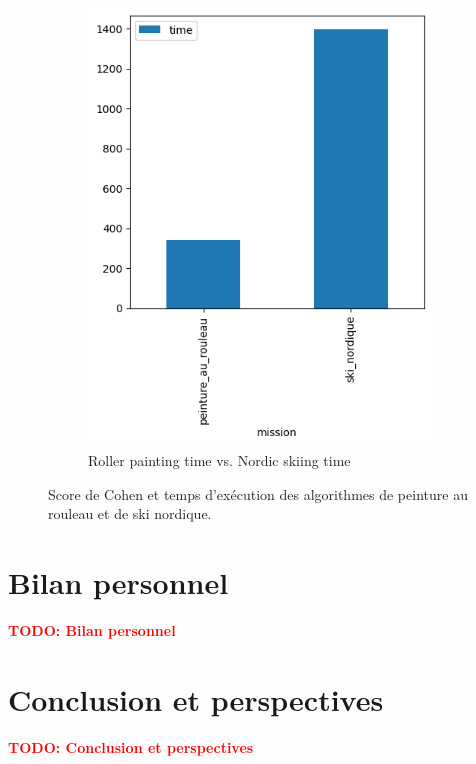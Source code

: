 \documentclass[francais,RandD]{rapportPFE}
\newcommand{\TODO}[1]{\textcolor{red}{\textbf{TODO: #1}}}
\begin{document}
\begin{figure}[h!]
\begin{subfigure}[t]{0.49\linewidth}
					\includegraphics[width=\linewidth]{graphics/peinture_au_rouleau-time_vs_ski_nordique-time.png}
					\caption{Roller painting time vs. Nordic skiing time}
					\label{fig:peinture_au_rouleau-time_vs_ski_nordique-time}
			\end{subfigure}
			\caption{Score de Cohen et temps d'exécution des algorithmes de peinture au rouleau et de ski nordique.}
			\label{fig:peinture_au_rouleau_vs_ski_nordique}
		\end{figure}
	\section{Bilan personnel}
		\TODO{Bilan personnel}
	\section{Conclusion et perspectives}
		\TODO{Conclusion et perspectives}
	\section*{}
	
	
	\appendix
\end{document}
